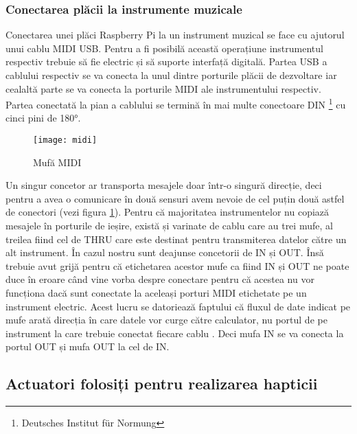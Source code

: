 \documentclass[../IoMusT.tex]{subfiles}
\begin{document}
\subsubsection{Conectarea plăcii la instrumente muzicale}
Conectarea unei plăci Raspberry Pi la un instrument muzical se face cu ajutorul unui cablu MIDI USB. Pentru a fi posibilă această operațiune instrumentul respectiv trebuie să fie electric și să suporte interfață digitală. Partea USB a cablului respectiv se va conecta la unul dintre porturile plăcii de dezvoltare iar cealaltă parte se va conecta la porturile MIDI ale instrumentului respectiv. Partea conectată la pian a cablului se termină în mai multe conectoare DIN \footnote{Deutsches Institut für Normung} cu cinci pini de 180\si{\degree}.
\begin{figure}[h]
\centering
\texttt{[image: midi]}
\caption{Mufă MIDI}
\label{fig:midi}
\end{figure}  
 Un singur concetor ar transporta  mesajele doar într-o singură direcție, deci pentru a avea o comunicare în două sensuri avem nevoie de cel puțin două astfel de conectori (vezi figura \ref{fig:midi}). Pentru că majoritatea instrumentelor nu copiază mesajele în porturile de ieșire, există și varinate de cablu care au trei mufe, al treilea fiind cel de THRU care este destinat pentru transmiterea datelor către un alt instrument. În cazul nostru sunt deajunse concetorii de IN și OUT. Însă trebuie avut grijă pentru că etichetarea acestor mufe ca fiind IN și OUT ne poate duce în eroare când vine vorba despre conectare pentru că acestea nu vor funcționa dacă sunt conectate la aceleași porturi MIDI etichetate pe un instrument electric. Acest lucru se datoriează faptului că fluxul de date indicat pe mufe arată direcția  în care datele vor curge către calculator, nu portul  de pe instrument la care  trebuie conectat fiecare cablu \cite{Midi}. Deci mufa IN se va conecta la portul OUT și mufa OUT la cel de IN.

\subsection{Actuatori folosiți pentru realizarea hapticii}
\end{document}

